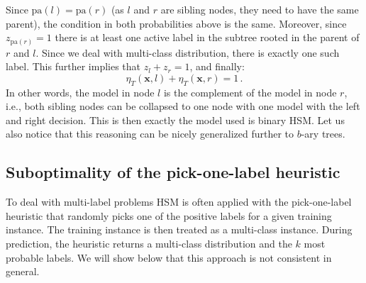 \documentclass{article}
\newcommand{\Algo}[1]{\textsc{#1}}
\renewcommand{\vec}[1]{\boldsymbol{#1}}
\newcommand{\bx}{\vec{x}}
\newcommand{\heta}{\hat{\eta}}
\newcommand{\pa}[1]{\mathrm{pa}(#1)}
\newcommand{\prob}{\mathbf{P}}
\newcommand{\sectionBefore}{-0pt}
\newcommand{\sectionAfter}{-0pt}
\begin{document}
Since $\pa{l} = \pa{r}$ (as $l$ and $r$ are sibling nodes, they need to have the same parent), the condition in both probabilities above is the same. Moreover, since $z_{\pa{r}} =1$ there is at least one active label in the subtree rooted in the parent of $r$ and $l$. Since we deal with multi-class distribution, there is exactly one such label. This further implies that $z_l + z_r = 1$, and finally: 
\begin{equation}
\eta_T(\bx, l)+ \eta_T(\bx, r) = 1 \,.
\label{eqn:sibling_summation}
\end{equation}
In other words, the model in node $l$ is the complement of the model in node $r$, i.e., both sibling nodes can be collapsed to one node with one model with the left and right decision. This is then exactly the model used is binary \Algo{HSM}. Let us also notice that this reasoning can be nicely generalized further to $b$-ary trees.


\vspace{\sectionBefore}
\subsection{Suboptimality of the pick-one-label heuristic}
\label{sec:pick-one-label}
\vspace{\sectionAfter}

To deal with multi-label problems HSM is often applied with the pick-one-label heuristic that randomly picks one of the positive labels for a given training instance. The training instance is then treated as a multi-class instance. During prediction, the heuristic returns a multi-class distribution and the $k$ most probable labels. 
We will show below that this approach is not consistent in general. 

\end{document}
